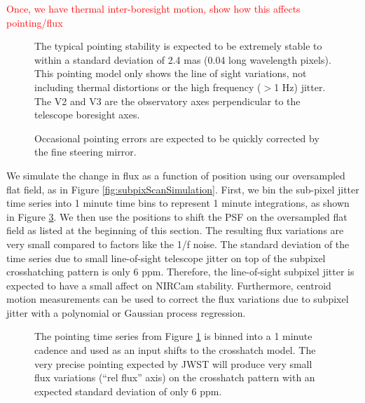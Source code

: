\documentclass{aastex62}
\begin{document}
\textcolor{red}{Once, we have thermal inter-boresight motion, show how this affects pointing/flux}

\begin{figure}
\caption{The typical pointing stability is expected to be extremely stable to within a standard deviation of 2.4 mas (0.04 long wavelength pixels).
This pointing model only shows the line of sight variations, not including thermal distortions or the high frequency ($>$1 Hz) jitter.
The V2 and V3 are the observatory axes perpendicular to the telescope boresight axes.
}\label{fig:tserPointingFull}
\end{figure}

\begin{figure}
\caption{Occasional pointing errors are expected to be quickly corrected by the fine steering mirror.
}\label{fig:tserPointingZoom}
\end{figure}

We simulate the change in flux as a function of position using our oversampled flat field, as in Figure \ref{fig:subpixScanSimulation}.
First, we bin the sub-pixel jitter time series into 1 minute time bins to represent 1 minute integrations, as shown in Figure \ref{fig:tserPointingAndFlux}.
We then use the positions to shift the PSF on the oversampled flat field as listed at the beginning of this section.
The resulting flux variations are very small compared to factors like the 1/f noise.
The standard deviation of the time series due to small line-of-sight telescope jitter on top of the subpixel crosshatching pattern is only 6 ppm.
Therefore, the line-of-sight subpixel jitter is expected to have a small affect on NIRCam stability.
Furthermore, centroid motion measurements can be used to correct the flux variations due to subpixel jitter with a polynomial or Gaussian process regression.

\begin{figure}
\caption{The pointing time series from Figure \ref{fig:tserPointingFull} is binned into a 1 minute cadence and used as an input shifts to the crosshatch model.
The very precise pointing expected by JWST will produce very small flux variations (``rel flux'' axis) on the crosshatch pattern with an expected standard deviation of only 6 ppm.
}\label{fig:tserPointingAndFlux}
\end{figure}
\end{document}
